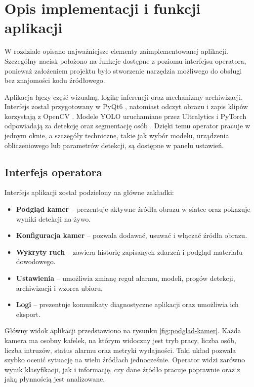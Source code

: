\clearpage
\section{Opis implementacji i funkcji aplikacji}		%

W rozdziale opisano najważniejsze elementy zaimplementowanej aplikacji. Szczególny nacisk położono na funkcje dostępne z poziomu interfejsu operatora, ponieważ założeniem projektu było stworzenie narzędzia możliwego do obsługi bez znajomości kodu źródłowego.

Aplikacja łączy część wizualną, logikę inferencji oraz mechanizmy archiwizacji. Interfejs został przygotowany w PyQt6 \cite{pyqtdocs}, natomiast odczyt obrazu i zapis klipów korzystają z OpenCV \cite{opencvdocs}. Modele YOLO uruchamiane przez Ultralytics i PyTorch odpowiadają za detekcję oraz segmentację osób \cite{ultralyticsdocs,pytorchdocs}. Dzięki temu operator pracuje w jednym oknie, a szczegóły techniczne, takie jak wybór modelu, urządzenia obliczeniowego lub parametrów detekcji, są dostępne w panelu ustawień.

\subsection{Interfejs operatora}

Interfejs aplikacji został podzielony na główne zakładki:

\begin{itemize}
\item \textbf{Podgląd kamer} -- prezentuje aktywne źródła obrazu w siatce oraz pokazuje wyniki detekcji na żywo.
\item \textbf{Konfiguracja kamer} -- pozwala dodawać, usuwać i włączać źródła obrazu.
\item \textbf{Wykryty ruch} -- zawiera historię zapisanych zdarzeń i podgląd materiału dowodowego.
\item \textbf{Ustawienia} -- umożliwia zmianę reguł alarmu, modeli, progów detekcji, archiwizacji i wzorca ubioru.
\item \textbf{Logi} -- prezentuje komunikaty diagnostyczne aplikacji oraz umożliwia ich eksport.
\end{itemize}

Główny widok aplikacji przedstawiono na rysunku \ref{fig:podglad-kamer}. Każda kamera ma osobny kafelek, na którym widoczny jest tryb pracy, liczba osób, liczba intruzów, status alarmu oraz metryki wydajności. Taki układ pozwala szybko ocenić sytuację na wielu źródłach jednocześnie. Operator widzi zarówno wynik klasyfikacji, jak i informację, czy dane źródło pracuje poprawnie oraz z jaką płynnością jest analizowane.

